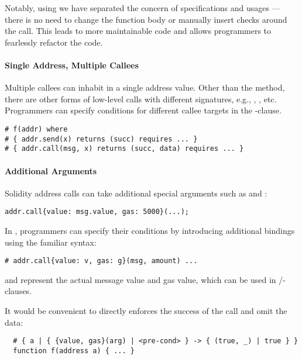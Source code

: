 Notably, using \lang we have separated the concern of specifications and usages
--- there is no need to change the function body or manually insert checks
around the call. This leads to more maintainable code and allows programmers to
fearlessly refactor the code.

\paragraph{Single Address, Multiple Callees}
Multiple callees can inhabit in a single address value.
Other than the  method, there are other forms of low-level calls with
different signatures, e.g., , , etc.
Programmers can specify conditions for different callee targets in the
-clause.
\begin{lstlisting}
# f(addr) where
# { addr.send(x) returns (succ) requires ... }
# { addr.call(msg, x) returns (succ, data) requires ... }
\end{lstlisting}


\paragraph{Additional Arguments}
Solidity address calls can take additional special arguments
such as  and :
\begin{lstlisting}
addr.call{value: msg.value, gas: 5000}(...);
\end{lstlisting}
In \lang, programmers can specify their conditions by introducing additional
bindings using the familiar syntax:
\begin{lstlisting}
# addr.call{value: v, gas: g}(msg, amount) ...
\end{lstlisting}
 and  represent the actual message value and gas
value, which can be used in /-clauses.

\iffalse
It would be convenient to directly enforces the success of the call and omit
the data:
\begin{lstlisting}
  # { a | { {value, gas}(arg) | <pre-cond> } -> { (true, _) | true } }
  function f(address a) { ... }
\end{lstlisting}

